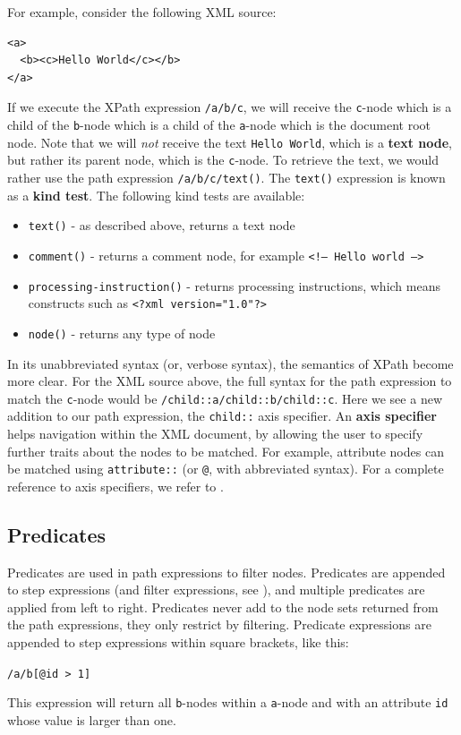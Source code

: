 For example, consider the following XML source:
\begin{center}
\begin{minipage}[h]{5.2cm}
\begin{verbatim}
<a>
  <b><c>Hello World</c></b>
</a>
\end{verbatim}
\end{minipage}
\end{center}
If we execute the XPath expression \verb!/a/b/c!, we will receive the
\verb!c!-node which is a child of the \verb!b!-node which is a child of the
\verb!a!-node which is the document root node. Note that we will \textit{not}
receive the text \texttt{Hello World}, which is a \textbf{text node}, but rather its
parent node, which is the \verb!c!-node. To retrieve the text, we would rather
use the path expression \verb!/a/b/c/text()!. The  \verb!text()! expression is
known as a \textbf{kind test}. The following kind tests are available:
\begin{itemize}
  \item \verb!text()! - as described above, returns a text node
  \item \verb!comment()! - returns a comment node, for example \texttt{<!-- Hello
  world -->}
  \item \verb!processing-instruction()! - returns processing instructions, which
  means constructs such as \texttt{<?xml version="1.0"?>}
  \item \verb!node()! - returns any type of node 
\end{itemize} 

In its unabbreviated syntax (or, verbose syntax), the semantics of XPath
become more clear. For the XML source above, the full syntax for the path
expression to match the \verb!c!-node would be
\texttt{/child::a/child::b/child::c}. Here we see a new addition to our path
expression, the \verb!child::! axis specifier. An \textbf{axis specifier} helps
navigation within the XML document, by allowing the user to specify further
traits about the nodes to be matched. For example, attribute nodes can be
matched using \verb!attribute::! (or \verb!@!, with abbreviated syntax). For a
complete reference to axis specifiers, we refer to \cite{w3c01}.

\subsection{Predicates}
\label{sect:theory:xquery:Predicates}
Predicates are used in path expressions to filter nodes. Predicates are
appended to step expressions (and filter expressions, see \cite{w3c01}), and multiple predicates
are applied from left to right. Predicates never add to the node sets returned from the path expressions, they
only restrict by filtering. Predicate expressions are appended to step expressions within square brackets, like
this:
\begin{center}
\verb!/a/b[@id > 1]!
\end{center} 
This expression will return all \verb!b!-nodes within a \verb!a!-node and with an attribute \verb!id! whose value
is larger than one.

